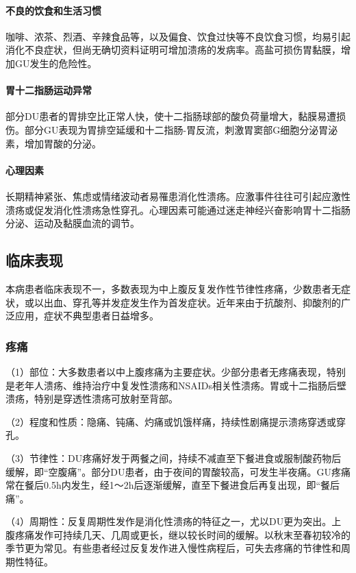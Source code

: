 \paragraph{不良的饮食和生活习惯}

咖啡、浓茶、烈酒、辛辣食品等，以及偏食、饮食过快等不良饮食习惯，均易引起消化不良症状，但尚无确切资料证明可增加溃疡的发病率。高盐可损伤胃黏膜，增加GU发生的危险性。
\paragraph{胃十二指肠运动异常}

部分DU患者的胃排空比正常人快，使十二指肠球部的酸负荷量增大，黏膜易遭损伤。部分GU表现为胃排空延缓和十二指肠-胃反流，刺激胃窦部G细胞分泌胃泌素，增加胃酸的分泌。
\paragraph{心理因素}

长期精神紧张、焦虑或情绪波动者易罹患消化性溃疡。应激事件往往可引起应激性溃疡或促发消化性溃疡急性穿孔。心理因素可能通过迷走神经兴奋影响胃十二指肠分泌、运动及黏膜血流的调节。

\subsection{临床表现}

本病患者临床表现不一，多数表现为中上腹反复发作性节律性疼痛，少数患者无症状，或以出血、穿孔等并发症发生作为首发症状。近年来由于抗酸剂、抑酸剂的广泛应用，症状不典型患者日益增多。

\subsubsection{疼痛}

（1）部位：大多数患者以中上腹疼痛为主要症状。少部分患者无疼痛表现，特别是老年人溃疡、维持治疗中复发性溃疡和NSAIDs相关性溃疡。胃或十二指肠后壁溃疡，特别是穿透性溃疡可放射至背部。

（2）程度和性质：隐痛、钝痛、灼痛或饥饿样痛，持续性剧痛提示溃疡穿透或穿孔。

（3）节律性：DU疼痛好发于两餐之间，持续不减直至下餐进食或服制酸药物后缓解，即“空腹痛”。部分DU患者，由于夜间的胃酸较高，可发生半夜痛。GU疼痛常在餐后0.5h内发生，经1～2h后逐渐缓解，直至下餐进食后再复出现，即“餐后痛”。

（4）周期性：反复周期性发作是消化性溃疡的特征之一，尤以DU更为突出。上腹疼痛发作可持续几天、几周或更长，继以较长时间的缓解。以秋末至春初较冷的季节更为常见。有些患者经过反复发作进入慢性病程后，可失去疼痛的节律性和周期性特征。

